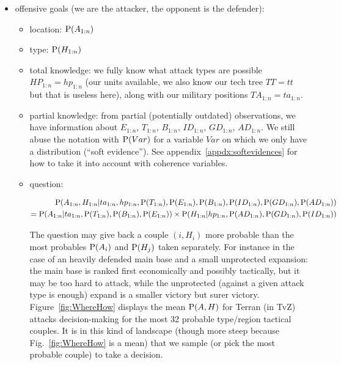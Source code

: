 \begin{itemize}
    \item offensive goals (we are the attacker, the opponent is the defender): 
    \begin{itemize}
        \item location: $\mathrm{P}(A_{1:n})$
        \item type: $\mathrm{P}(H_{1:n})$
        \item total knowledge: we fully know what attack types are possible $HP_{1:n}=hp_{1:n}$ (our units available, we also know our tech tree $TT=tt$ but that is useless here), along with our military positions $TA_{1:n}=ta_{1:n}$.
        \item partial knowledge: from partial (potentially outdated) observations, we have information about $E_{1:n}$, $T_{1:n}$, $B_{1:n}$, $ID_{1:n}$, $GD_{1:n}$, $AD_{1:n}$. We still abuse the notation with $\mathrm{P}(Var)$ for a variable $Var$ on which we only have a distribution (``soft evidence''). See appendix~\ref{appdx:softevidences} for how to take it into account with coherence variables.
        \item question: 
\begin{small}
\begin{eqnarray*}
 \mathrm{P}(A_{1:n},H_{1:n}|ta_{1:n},hp_{1:n},\mathrm{P}(T_{1:n}),\mathrm{P}(E_{1:n}),\mathrm{P}(B_{1:n}),\mathrm{P}(ID_{1:n}),\mathrm{P}(GD_{1:n}),\mathrm{P}(AD_{1:n}))\\
= \mathrm{P}(A_{1:n}|ta_{1:n},\mathrm{P}(T_{1:n}),\mathrm{P}(B_{1:n}),\mathrm{P}(E_{1:n}))\times \mathrm{P}(H_{1:n}|hp_{1:n},\mathrm{P}(AD_{1:n}),\mathrm{P}(GD_{1:n}),\mathrm{P}(ID_{1:n}))
\end{eqnarray*}
\end{small}
The question may give back a couple $(i,H_i)$ more probable than the most probables $\mathrm{P}(A_i)$ and $\mathrm{P}(H_j)$ taken separately. For instance in the case of an heavily defended main base and a small unprotected expansion: the main base is ranked first economically and possibly tactically, but it may be too hard to attack, while the unprotected (against a given attack type is enough) expand is a smaller victory but surer victory. Figure~\ref{fig:WhereHow} displays the mean $\mathrm{P}(A,H)$ for Terran (in TvZ) attacks decision-making for the most 32 probable type/region tactical couples. It is in this kind of landscape (though more steep because Fig.~\ref{fig:WhereHow} is a mean) that we sample (or pick the most probable couple) to take a decision.
    \end{itemize}

\end{itemize}

